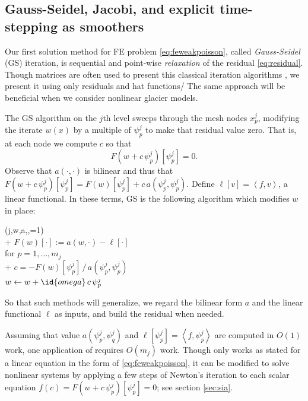 \documentclass[letterpaper,final,12pt,reqno]{amsart}
\theoremstyle{claim}
\newcommand{\ip}[2]{\left<#1,#2\right>}
\numberwithin{equation}{section}
\numberwithin{figure}{section}
\numberwithin{table}{section}
\numberwithin{theorem}{section}
\begin{document}
\subsection{Gauss-Seidel, Jacobi, and explicit time-stepping as smoothers} \label{subsec:smoothers}  Our first solution method for FE problem \eqref{eq:feweakpoisson}, called \emph{Gauss-Seidel} (GS) iteration, is sequential and point-wise \emph{relaxation} of the residual \eqref{eq:residual}.  Though matrices are often used to present this classical iteration algorithms \cite[for example]{Bueler2021,Greenbaum1997}, we present it using only residuals and hat functions/  The same approach will be beneficial when we consider nonlinear glacier models.

The GS algorithm on the $j$th level sweeps through the mesh nodes $x_p^j$, modifying the iterate $w(x)$ by a multiple of $\psi_p^j$ to make that residual value zero.  That is, at each node we compute $c$ so that
\begin{equation}
  F(w+c\,\psi_p^j)[\psi_p^j] = 0.  \label{eq:gaussseidelpoint}
\end{equation}
Observe that $a(\cdot,\cdot)$ is bilinear and thus that $F(w+c\,\psi_p^j)[\psi_p^j] = F(w)[\psi_p^j] + c\, a(\psi_p^j,\psi_p^j)$.  Define $\ell[v] = \ip{f}{v}$, a linear functional.  In these terms, GS is the following algorithm which modifies $w$ in place:
\begin{pseudo*} \label{ps:gs-sweep}
(j,w,a,\ell,=1)\text{:} \\+
    $F(w)[\cdot] := a(w,\cdot) - \ell[\cdot]$ \\
    for $p=1,\dots,m_j$ \\+
        $\displaystyle c = - F(w)[\psi_p^j]\, \big/ \,a(\psi_p^j,\psi_p^j)$  \\
        $w \gets w + \id{omega} \,c \,\psi_p^j$
\end{pseudo*}
So that such methods will generalize, we regard the bilinear form $a$ and the linear functional $\ell$ as inputs, and build the residual when needed.

Assuming that value $a(\psi_p^j,\psi_q^j)$ and $\ell[\psi_p^j] = \ip{f}{\psi_p^j}$ are computed in $O(1)$ work, one application of  requires $O(m_j)$ work.  Though  only works as stated for a linear equation in the form of \eqref{eq:feweakpoisson}, it can be modified to solve nonlinear systems by applying a few steps of Newton's iteration to each scalar equation $f(c) = F(w+c\,\psi_p^j)[\psi_p^j] = 0$; see section \ref{sec:sia}.
\end{document}
